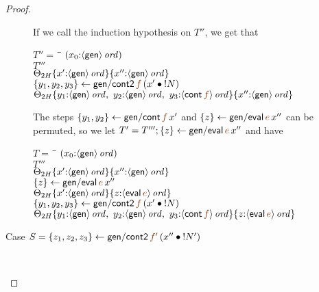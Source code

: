 \begin{proof}
\begin{description}
    \medskip
    If we 
    call the induction hypothesis on $T''$, we get that

\begin{tabbing}
$T'' = ~$ \= \qquad \= $(x_0{:}{\langle {\sf gen} \rangle}\,{{\it ord}})$
\\
\>$T'''$
\\
\>\>$     {
             {\Theta_{2H}}\{{x'{:}{\langle {{\sf gen}} \rangle}\,{{\it ord}}}\}}\{{x''{:}{\langle {{\sf gen}} \rangle}\,{{\it ord}}}\}$
\\
\>$\trstep{y_1, y_2, y_3}{{\sf gen/cont2}\,\lf{f}\,(\tfuser{x'}{\tbangr{N}})}$
\\
\>\>$     \tackon{
             \tackon{\Theta_{2H}}
                {y_1{:}\istrue{\susp{{\sf gen}}}, ~ 
                 y_2{:}\istrue{\susp{{\sf gen}}}, ~ 
                 y_3{:}\istrue{\susp{{\sf cont}\,\lf{f}}}}}
             {x''{:}\istrue{\susp{{\sf gen}}}}$
\end{tabbing}

The steps $\trstep{y_1, y_2}{{\sf gen/cont}\,\lf{f}\,x'}$
and $\trstep{z}{{\sf gen/eval}\,\lf{e}\,x''}$ can be permuted, so 
we let $T' = T'''; \trstep{z}{{\sf gen/eval}\,\lf{e}\,x''}$ and have

\begin{tabbing}
$T = ~$ \= \qquad \= $(x_0{:}{\langle {\sf gen} \rangle}\,{{\it ord}})$
\\
\>$T'''$
\\
\>\>$     {
             {\Theta_{2H}}\{{x'{:}{\langle {{\sf gen}} \rangle}\,{{\it ord}}}\}}\{{x''{:}{\langle {{\sf gen}} \rangle}\,{{\it ord}}}\}$
\\
\>$\trstep{z}{{\sf gen/eval}\,\lf{e}\,x''}$
\\
\>\>$     \tackon{
             \tackon{\Theta_{2H}}
                {x'{:}\istrue{\susp{{\sf gen}}}}}
             {z{:}\istrue{\susp{{\sf eval}\,\lf{e}}}}$
\\
\>$\trstep{y_1, y_2, y_3}{{\sf gen/cont2}\,\lf{f}\,(\tfuser{x'}{\tbangr{N}})}$
\\
\>\>$     \tackon{
             \tackon{\Theta_{2H}}
                {y_1{:}\istrue{\susp{{\sf gen}}}, ~ 
                 y_2{:}\istrue{\susp{{\sf gen}}}, ~ 
                 y_3{:}\istrue{\susp{{\sf cont}\,\lf{f}}}}}
             {z{:}\istrue{\susp{{\sf eval}\,\lf{e}}}}$
\end{tabbing}

  \item[Case $S = \trstep{z_1, z_2, z_3}{{\sf gen/cont2}\,\lf{f'}\,(\tfuser{x''}{\tbangr{N'}})}$]~


\end{description}
\end{proof}
